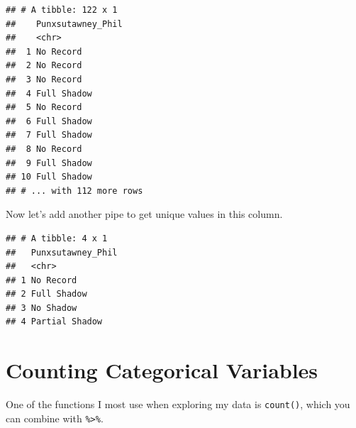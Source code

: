 \documentclass[
]{book}
\newenvironment{Shaded}{\begin{snugshade}}{\end{snugshade}}
\newcommand{\KeywordTok}[1]{\textcolor[rgb]{0.13,0.29,0.53}{\textbf{#1}}}
\newcommand{\NormalTok}[1]{#1}
\newcommand{\OperatorTok}[1]{\textcolor[rgb]{0.81,0.36,0.00}{\textbf{#1}}}
\newcommand{\StringTok}[1]{\textcolor[rgb]{0.31,0.60,0.02}{#1}}
\begin{document}
\begin{Shaded}
\end{Shaded}

\begin{verbatim}
## # A tibble: 122 x 1
##    Punxsutawney_Phil
##    <chr>            
##  1 No Record        
##  2 No Record        
##  3 No Record        
##  4 Full Shadow      
##  5 No Record        
##  6 Full Shadow      
##  7 Full Shadow      
##  8 No Record        
##  9 Full Shadow      
## 10 Full Shadow      
## # ... with 112 more rows
\end{verbatim}

Now let's add another pipe to get unique values in this column.

\begin{Shaded}
\end{Shaded}

\begin{verbatim}
## # A tibble: 4 x 1
##   Punxsutawney_Phil
##   <chr>            
## 1 No Record        
## 2 Full Shadow      
## 3 No Shadow        
## 4 Partial Shadow
\end{verbatim}

\hypertarget{counting-categorical-variables}{%
\section{Counting Categorical Variables}\label{counting-categorical-variables}}

One of the functions I most use when exploring my data is \texttt{count()}, which you can combine with \texttt{\%\textgreater{}\%}.

\begin{Shaded}
\end{Shaded}
\end{document}
